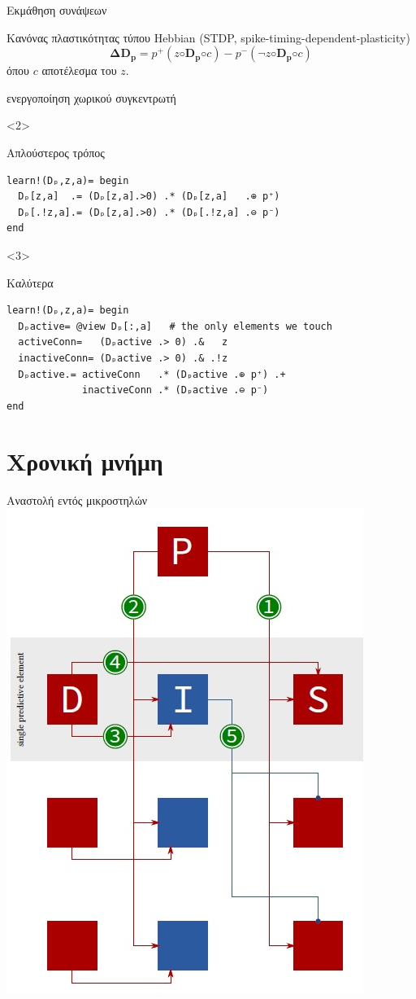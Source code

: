 \documentclass[10pt,lualatex]{beamer}
\begin{document}
\begin{frame}[fragile]{Εκμάθηση συνάψεων}
\begin{block}{Κανόνας πλαστικότητας τύπου Hebbian (\footnotesize STDP, spike-timing-dependent-plasticity)}
  \[ \mathbf{ΔD_p} = p^+(z◦\mathbf{D_p}◦c) - p^-(\lnot z◦ \mathbf{D_p}◦c)\]
	όπου $c$ αποτέλεσμα του $z$.
  \begin{description}[fffff]
		\small
    \item[$c$] ενεργοποίηση χωρικού συγκεντρωτή
  \end{description}
\end{block}
\begin{onlyenv}<2>
\begin{block}{Απλούστερος τρόπος}
\begin{verbatim}
learn!(Dₚ,z,a)= begin
  Dₚ[z,a]  .= (Dₚ[z,a].>0) .* (Dₚ[z,a]   .⊕ p⁺)
  Dₚ[.!z,a].= (Dₚ[z,a].>0) .* (Dₚ[.!z,a] .⊖ p⁻)
end
\end{verbatim}
\end{block}
\end{onlyenv}
\begin{onlyenv}<3>
\begin{block}{Καλύτερα}
\begin{verbatim}
learn!(Dₚ,z,a)= begin
  Dₚactive= @view Dₚ[:,a]   # the only elements we touch
  activeConn=   (Dₚactive .> 0) .&   z
  inactiveConn= (Dₚactive .> 0) .& .!z
  Dₚactive.= activeConn   .* (Dₚactive .⊕ p⁺) .+
             inactiveConn .* (Dₚactive .⊖ p⁻)
end
\end{verbatim}
\end{block}
\end{onlyenv}
\end{frame}

\section{Χρονική μνήμη}

\begin{frame}{Αναστολή \alert{εντός} μικροστηλών}
  \centering
  \includegraphics[width=.5\textwidth]{../figures/temporal_hardware}
\end{frame}
\end{document}
